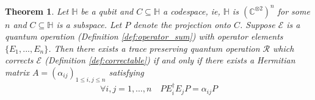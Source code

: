 \documentclass[12pt]{article}
\theoremstyle{plain}
\newtheorem{thm}{Theorem}[subsection] %
\theoremstyle{definition}
\newcommand{\bb}[1]{\mathbb{#1}}
\newcommand{\call}[1]{\mathcal{#1}}
\begin{document}
	\begin{thm}\label{thm:general_error_correction}
		Let $\bb{H}$ be a qubit and $C \subseteq \bb{H}$ a codespace, ie, $\bb{H}$ is $(\bb{C}^{\otimes 2})^n$ for some $n$ and $C \subseteq \bb{H}$ is a subspace. Let $P$ denote the projection onto $C$. Suppose $\call{E}$ is a quantum operation (Definition \ref{def:operator_sum}) with operator elements $\lbrace E_1,...,E_n\rbrace$. Then there exists a trace preserving quantum operation $\call{R}$ which corrects $\call{E}$ (Definition \ref{def:correctable}) if and only if there exists a Hermitian matrix $A = (\alpha_{ij})_{1 \leq i,j \leq n}$ satisfying
		\begin{equation}\label{eq:error_correction_conditions}
			\forall i, j =1,\ldots, n\quad PE_i^\dagger E_j P = \alpha_{ij}P
		\end{equation}
	\end{thm}
\end{document}
